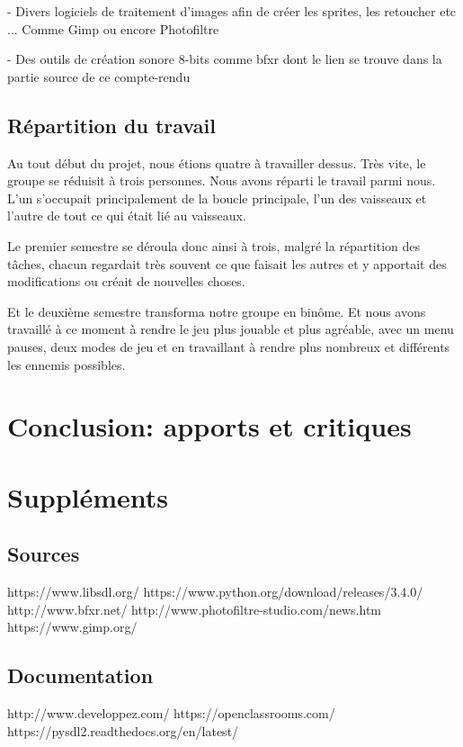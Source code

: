 \documentclass{article}
\begin{document}
- Divers logiciels de traitement d'images afin de créer les sprites, les retoucher etc ... Comme Gimp ou encore Photofiltre \newline

- Des outils de création sonore 8-bits comme bfxr dont le lien se trouve dans la partie source de ce compte-rendu   

\subsection{Répartition du travail}

Au tout début du projet, nous étions quatre à travailler dessus. Très vite, le groupe se réduisit à trois personnes. Nous avons réparti le travail parmi nous. L'un s'occupait principalement de la boucle principale, l'un des vaisseaux et l'autre de tout ce qui était lié au vaisseaux. \newline

Le premier semestre se déroula donc ainsi à trois, malgré la répartition des tâches, chacun regardait très souvent ce que faisait les autres et y apportait des modifications ou créait de nouvelles choses. \newline

Et le deuxième semestre transforma notre groupe en binôme. Et nous avons travaillé à ce moment à rendre le jeu plus jouable et plus agréable, avec un menu pauses, deux modes de jeu et en travaillant à rendre plus nombreux et différents les ennemis possibles.

\newpage

\section{Conclusion: apports et critiques}

\newpage

\section{Suppléments}

\subsection{Sources}

\noindent https://www.libsdl.org/ \newline
https://www.python.org/download/releases/3.4.0/ \newline
http://www.bfxr.net/ \newline 
http://www.photofiltre-studio.com/news.htm \newline
https://www.gimp.org/


\subsection{Documentation}

\noindent http://www.developpez.com/ \newline
https://openclassrooms.com/ \newline
https://pysdl2.readthedocs.org/en/latest/
\end{document}
